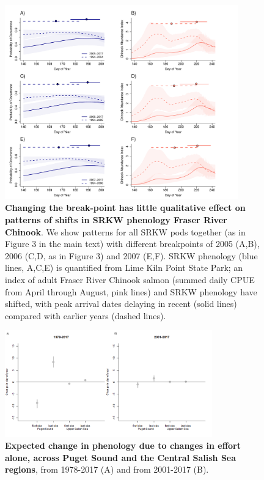 \documentclass{article}
\begin{document}
\newpage
\begin{figure}[!hp]
\includegraphics[width=0.9\textwidth]{../analyses/orcaphen/figures/orcachinphenoverlapSRallbrkyears.pdf}
\caption{\textbf{Changing the break-point has little qualitative effect on patterns of shifts in SRKW phenology Fraser River Chinook}. We show patterns for all SRKW pods together (as in Figure 3 in the main text) with different breakpoints of 2005 (A,B), 2006 (C,D, as in Figure 3) and 2007 (E,F). SRKW phenology (blue lines, A,C,E) is quantified from Lime Kiln Point State Park; an index of adult Fraser River Chinook salmon (summed daily CPUE from April through August, pink lines) and SRKW phenology have shifted, with peak arrival dates delaying in recent (solid lines) compared with earlier years (dashed lines).}
\label{fig:brkpt}
\end{figure}


\begin{figure}[!hp]
\includegraphics[width=0.8\textwidth]{../analyses/orcaphen/figures/simeffortonly2panels.png} 
\caption{\textbf{Expected change in phenology due to changes in effort alone, across Puget Sound and the Central Salish Sea regions}, from 1978-2017 (A) and from 2001-2017 (B). }
\label{fig:simeffort}
\end{figure}
\end{document}

